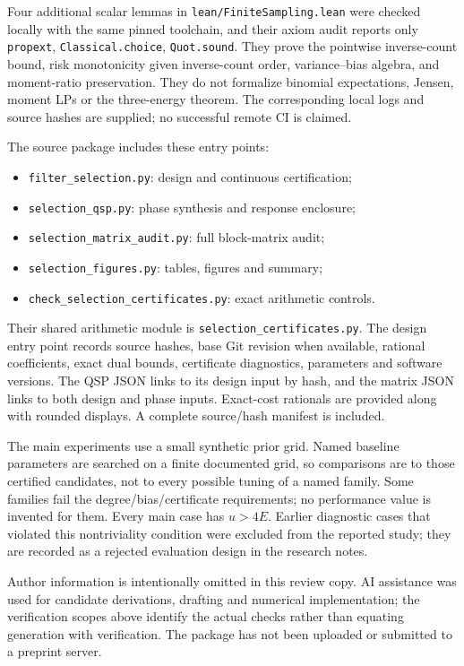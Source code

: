 Four additional scalar lemmas in \texttt{lean/FiniteSampling.lean} were
checked locally with the same pinned toolchain, and their axiom audit
reports only \texttt{propext}, \texttt{Classical.choice}, \texttt{Quot.sound}.
They prove the pointwise inverse-count bound, risk monotonicity given
inverse-count order, variance--bias algebra, and moment-ratio preservation.
They do not formalize binomial expectations, Jensen, moment LPs or the
three-energy theorem. The corresponding local logs and source hashes
are supplied; no successful remote CI is claimed.

The source package includes these entry points:
\begin{itemize}
\item \texttt{filter\_selection.py}: design and continuous certification;
\item \texttt{selection\_qsp.py}: phase synthesis and response enclosure;
\item \texttt{selection\_matrix\_audit.py}: full block-matrix audit;
\item \texttt{selection\_figures.py}: tables, figures and summary;
\item \texttt{check\_selection\_certificates.py}: exact arithmetic controls.
\end{itemize}
Their shared arithmetic module is \texttt{selection\_certificates.py}.
The design entry point records source
hashes, base Git revision when available, rational coefficients, exact
dual bounds, certificate diagnostics, parameters and software versions.
The QSP JSON links to its design input by hash, and the matrix JSON links
to both design and phase inputs. Exact-cost rationals are provided along
with rounded displays. A complete source/hash manifest is included.

The main experiments use a small synthetic prior grid. Named baseline
parameters are searched on a finite documented grid, so comparisons are
to those certified candidates, not to every possible tuning of a named
family. Some families fail the degree/bias/certificate requirements; no
performance value is invented for them. Every main case has $u>4E$.
Earlier diagnostic cases that violated this nontriviality condition were
excluded from the reported study; they are recorded as a rejected
evaluation design in the research notes.

Author information is intentionally omitted in this review copy.
AI assistance was used for candidate derivations, drafting and numerical
implementation; the verification scopes above identify the actual checks
rather than equating generation with verification. The package has not
been uploaded or submitted to a preprint server.
